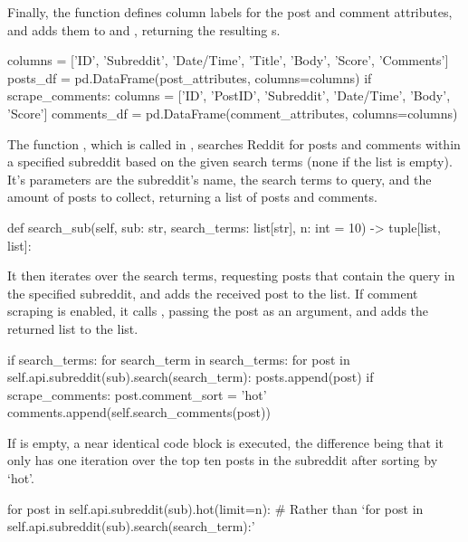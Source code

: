 Finally, the function defines column labels for the post and comment attributes, and adds them to  and , returning the resulting s.

\begin{python}
columns = ['ID', 'Subreddit', 'Date/Time', 'Title', 'Body', 'Score', 'Comments']
posts_df = pd.DataFrame(post_attributes, columns=columns)
if scrape_comments: 
    columns = ['ID', 'PostID', 'Subreddit', 'Date/Time', 'Body', 'Score']
    comments_df = pd.DataFrame(comment_attributes, columns=columns)
\end{python}

The function , which is called in , searches Reddit for posts and comments within a specified subreddit based on the given search terms (none if the list is empty). It's parameters are the subreddit's name, the search terms to query, and the amount of posts to collect, returning a list of posts and comments.

\begin{python}
def search_sub(self, sub: str, search_terms: list[str], n: int = 10) -> tuple[list, list]:
\end{python}

It then iterates over the search terms, requesting posts that contain the query in the specified subreddit, and adds the received post to the  list. If comment scraping is enabled, it calls , passing the post as an argument, and adds the returned list to the  list.

\begin{python}
if search_terms:
    for search_term in search_terms:
        for post in self.api.subreddit(sub).search(search_term):
            posts.append(post)
            if scrape_comments:
                post.comment_sort = 'hot'
                comments.append(self.search_comments(post))
\end{python}

If  is empty, a near identical code block is executed, the difference being that it only has one iteration over the top ten posts in the subreddit after sorting by `hot'.

\begin{python}
for post in self.api.subreddit(sub).hot(limit=n):
# Rather than `for post in self.api.subreddit(sub).search(search_term):'
\end{python}

